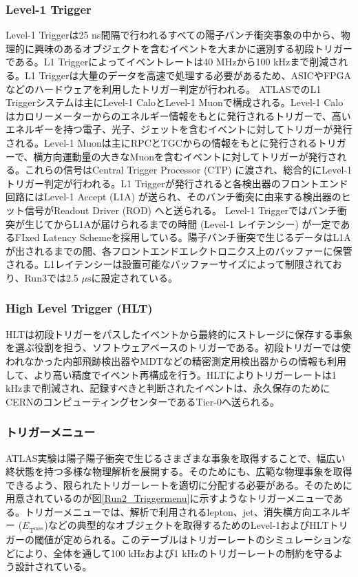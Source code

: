     \subsubsection{Level-1 Trigger}
    \baselineskip
    Level-1 Triggerは25 ns間隔で行われるすべての陽子バンチ衝突事象の中から、物理的に興味のあるオブジェクトを含むイベントを大まかに選別する初段トリガーである。L1 Triggerによってイベントレートは40 MHzから100 kHzまで削減される。L1 Triggerは大量のデータを高速で処理する必要があるため、ASICやFPGAなどのハードウェアを利用したトリガー判定が行われる。
    ATLASでのL1 Triggerシステムは主にLevel-1 CaloとLevel-1 Muonで構成される。Level-1 Caloはカロリーメーターからのエネルギー情報をもとに発行されるトリガーで、高いエネルギーを持つ電子、光子、ジェットを含むイベントに対してトリガーが発行される。Level-1 Muonは主にRPCとTGCからの情報をもとに発行されるトリガーで、横方向運動量の大きなMuonを含むイベントに対してトリガーが発行される。これらの信号はCentral Trigger Processor (CTP) に渡され、総合的にLevel-1トリガー判定が行われる。L1 Triggerが発行されると各検出器のフロントエンド回路にはLevel-1 Accept (L1A) が送られ、そのバンチ衝突に由来する検出器のヒット信号がReadout Driver (ROD) へと送られる。
    Level-1 Triggerではバンチ衝突が生じてからL1Aが届けられるまでの時間 (Level-1 レイテンシー) が一定であるFIxed Latency Schemeを採用している。陽子バンチ衝突で生じるデータはL1Aが出されるまでの間、各フロントエンドエレクトロニクス上のバッファーに保管される。L1レイテンシーは設置可能なバッファーサイズによって制限されており、Run3では2.5 $\mu\mathrm{s}$に設定されている。

    \subsubsection*{High Level Trigger (HLT) }
    \baselineskip
    HLTは初段トリガーをパスしたイベントから最終的にストレージに保存する事象を選ぶ役割を担う、ソフトウェアベースのトリガーである。初段トリガーでは使われなかった内部飛跡検出器やMDTなどの精密測定用検出器からの情報も利用して、より高い精度でイベント再構成を行う。HLTによりトリガーレートは1 kHzまで削減され、記録すべきと判断されたイベントは、永久保存のためにCERNのコンピューティングセンターであるTier-0へ送られる。

    \subsubsection*{トリガーメニュー}
    ATLAS実験は陽子陽子衝突で生じるさまざまな事象を取得することで、幅広い終状態を持つ多様な物理解析を展開する。そのためにも、広範な物理事象を取得できるよう、限られたトリガーレートを適切に分配する必要がある。そのために用意されているのが図\ref{Run2_Triggermenu}に示すようなトリガーメニューである。トリガーメニューでは、解析で利用されるlepton、jet、消失横方向エネルギー ($E_{\mathrm{T}^{\mathrm{miss}}}$)などの典型的なオブジェクトを取得するためのLevel-1およびHLTトリガーの閾値が定められる。このテーブルはトリガーレートのシミュレーションなどにより、全体を通して100 kHzおよび1 kHzのトリガーレートの制約を守るよう設計されている。

